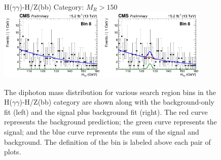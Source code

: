 \begin{figure}[ht!]
\centering
H($\gamma\gamma$)-H/Z(bb) Category: $M_{R}>150$\GeV \\
\includegraphics[width=0.45\textwidth, angle=0.]{figs/unblindedResults2p3Plus12p9/bin8_fit_b.png}
\includegraphics[width=0.45\textwidth, angle=0.]{figs/unblindedResults2p3Plus12p9/bin8_fit_s.png}\\
\caption{ The diphoton mass distribution for various search region bins in the H($\gamma\gamma$)-H/Z(bb) category 
are shown along with the background-only fit (left) and the signal plus background fit (right). 
The red curve represents the background prediction; the green curve represents the signal; 
and the blue curve represents the sum of the signal and background. The definition of the bin
is labeled above each pair of plots.
\label{fig:UnblindedResultsHZbb}}
\end{figure}


